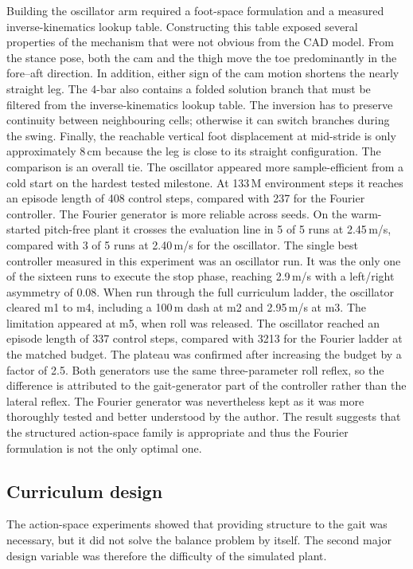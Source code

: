 Building the oscillator arm required a foot-space formulation and a measured inverse-kinematics lookup table.
Constructing this table exposed several properties of the mechanism that were not obvious from the CAD model.
From the stance pose, both the cam and the thigh move the toe predominantly in the fore--aft direction.
In addition, either sign of the cam motion shortens the nearly straight leg.
The 4-bar also contains a folded solution branch that must be filtered from the inverse-kinematics lookup table.
The inversion has to preserve continuity between neighbouring cells; otherwise it can switch branches during the swing.
Finally, the reachable vertical foot displacement at mid-stride is only approximately 8\,cm because the leg is close to its straight configuration.
The comparison is an overall tie.
The oscillator appeared more sample-efficient from a cold start on the hardest tested milestone.
At 133\,M environment steps it reaches an episode length of 408 control steps, compared with 237 for the Fourier controller.
The Fourier generator is more reliable across seeds.
On the warm-started pitch-free plant it crosses the evaluation line in 5 of 5 runs at 2.45\,m/s, compared with 3 of 5 runs at 2.40\,m/s for the oscillator.
The single best controller measured in this experiment was an oscillator run.
It was the only one of the sixteen runs to execute the stop phase, reaching 2.9\,m/s with a left/right asymmetry of 0.08.
When run through the full curriculum ladder, the oscillator cleared m1 to m4, including a 100\,m dash at m2 and 2.95\,m/s at m3.
The limitation appeared at m5, when roll was released.
The oscillator reached an episode length of 337 control steps, compared with 3213 for the Fourier ladder at the matched budget.
The plateau was confirmed after increasing the budget by a factor of 2.5.
Both generators use the same three-parameter roll reflex, so the difference is attributed to the gait-generator part of the controller rather than the lateral reflex.
The Fourier generator was nevertheless kept as it was more thoroughly tested and better understood by the author.
The result suggests that the structured action-space family is appropriate and thus the Fourier formulation is not the only optimal one.

\subsection{Curriculum design}

\label{sec:rl-curriculum}

The action-space experiments showed that providing structure to the gait was necessary, but it did not solve the balance problem by itself.
The second major design variable was therefore the difficulty of the simulated plant.

